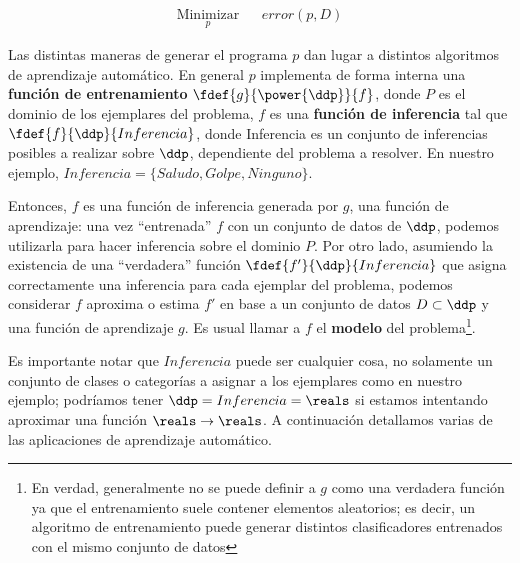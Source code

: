 \begin{equation*}
\begin{aligned}
\underset{p}{\text{Minimizar}} & & error(p,D) 
\end{aligned}
\end{equation*}

Las distintas maneras de generar el programa $p$ dan lugar a distintos algoritmos de aprendizaje automático. En general $p$ implementa de forma interna una \textbf{función de entrenamiento} $ \fdef{g}{\power{\ddp}}{f}$, donde $P$ es el dominio de los ejemplares del problema, $f$ es una \textbf{función de inferencia} tal que $\fdef{f}{\ddp}{Inferencia}$, donde Inferencia es un conjunto de inferencias posibles a realizar sobre $\ddp$, dependiente del problema a resolver. En nuestro ejemplo, $Inferencia=\{ Saludo, Golpe, Ninguno \}$. 

Entonces, $f$ es una función de inferencia generada por $g$, una función de aprendizaje:  una vez ``entrenada'' $f$ con un conjunto de datos de $\ddp$, podemos utilizarla para hacer inferencia sobre el dominio $P$. Por otro lado, asumiendo la existencia de una ``verdadera'' función $\fdef{f'}{\ddp}{Inferencia}$ que asigna correctamente una inferencia para cada ejemplar del problema, podemos considerar $f$ aproxima o estima $f'$ en base a un conjunto de datos $D \subset \ddp$ y una función de aprendizaje $g$. Es usual llamar a $f$ el \textbf{modelo} del problema\footnote{En verdad, generalmente no se puede definir a $g$ como una verdadera función ya que el entrenamiento suele contener elementos aleatorios; es decir, un algoritmo de entrenamiento puede generar distintos clasificadores entrenados con el mismo conjunto de datos}.

Es importante notar que $Inferencia$ puede ser cualquier cosa, no solamente un conjunto de clases o categorías a asignar a los ejemplares como en nuestro ejemplo; podríamos tener $\ddp=Inferencia=\reals$ si estamos intentando aproximar una función $\reals \rightarrow \reals$. A continuación detallamos varias de las aplicaciones de aprendizaje automático.
